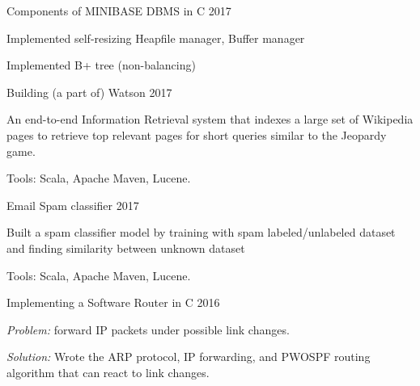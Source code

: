 \begin{cventries}
  \cventry
    {}
    {Components of MINIBASE DBMS in C} %
    {2017} %
    {}
    {
      \vspace{-3mm}
      \begin{cvitems} %
        \item {Implemented self-resizing Heapfile manager, Buffer manager}
        \item {Implemented B+ tree (non-balancing)}
      \end{cvitems}
    }
    {}

  \cventry
    {}
    {Building (a part of) Watson} %
    {2017} %
    {}
    {
      \vspace{-3mm}
      \begin{cvitems} %
        \item {An end-to-end Information Retrieval system that indexes a large set of Wikipedia pages to retrieve top relevant pages for short queries similar to the Jeopardy game.}
        \item {Tools: Scala, Apache Maven, Lucene.}
      \end{cvitems}
    }
    {}

  \cventry
    {}
    {Email Spam classifier} %
    {2017} %
    {}
    {
      \vspace{-3mm}
      \begin{cvitems} %
        \item {Built a spam classifier model by training with spam labeled/unlabeled dataset and finding similarity between unknown dataset}
        \item {Tools: Scala, Apache Maven, Lucene.}
      \end{cvitems}
    }
    {}

  \cventry
    {}
    {Implementing a Software Router in C} %
    {2016} %
    {}
    {
      \vspace{-3mm}
      \begin{cvitems} %
        \item {\textit{Problem:} forward IP packets under possible link changes.}
        \item {\textit{Solution:} Wrote the ARP protocol, IP forwarding, and PWOSPF routing algorithm that can react to link changes.}
      \end{cvitems}
    }
    {}


\end{cventries}

